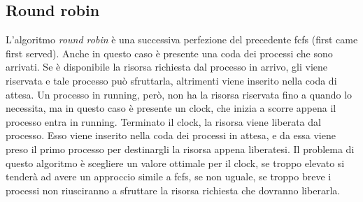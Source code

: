\documentclass[Lau, oneside]{sapthesis}%
\begin{document}
\subsection{Round robin}
\label{ssec:rr}
L'algoritmo \textit{round robin} è una successiva perfezione del precedente fcfs (first came first served).
Anche in questo caso è presente una coda dei processi che sono arrivati.
Se è disponibile la risorsa richiesta dal processo in arrivo, gli viene riservata e tale processo può sfruttarla, altrimenti viene inserito nella coda di attesa.
Un processo in running, però, non ha la risorsa riservata fino a quando lo necessita, ma in questo caso è presente un clock, che inizia a scorre appena il processo entra in running.
Terminato il clock, la risorsa viene liberata dal processo.
Esso viene inserito nella coda dei processi in attesa, e da essa viene preso il primo processo per destinargli la risorsa appena liberatesi.
Il problema di questo algoritmo è scegliere un valore ottimale per il clock, se troppo elevato si tenderà ad avere un approccio simile a fcfs, se non uguale, se troppo breve i processi non riusciranno a sfruttare la risorsa richiesta che dovranno liberarla.
\end{document}
